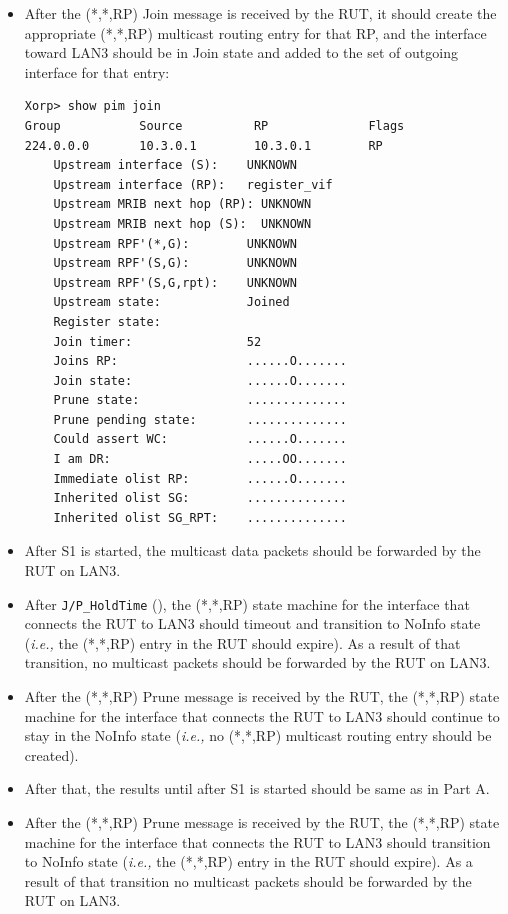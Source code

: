 \documentclass[11pt]{report}
\newcommand{\ie}{\emph{i.e.,}\xspace}
\begin{document}
\begin{itemize}

  \item After the (*,*,RP) Join message is received by the RUT, it
  should create the appropriate (*,*,RP) multicast routing entry for
  that RP, and the interface toward LAN3 should be in Join state and
  added to the set of outgoing interface for that entry:

\begin{verbatim}
Xorp> show pim join 
Group           Source          RP              Flags
224.0.0.0       10.3.0.1        10.3.0.1        RP   
    Upstream interface (S):    UNKNOWN
    Upstream interface (RP):   register_vif
    Upstream MRIB next hop (RP): UNKNOWN
    Upstream MRIB next hop (S):  UNKNOWN
    Upstream RPF'(*,G):        UNKNOWN
    Upstream RPF'(S,G):        UNKNOWN
    Upstream RPF'(S,G,rpt):    UNKNOWN
    Upstream state:            Joined 
    Register state:            
    Join timer:                52
    Joins RP:                  ......O.......
    Join state:                ......O.......
    Prune state:               ..............
    Prune pending state:       ..............
    Could assert WC:           ......O.......
    I am DR:                   .....OO.......
    Immediate olist RP:        ......O.......
    Inherited olist SG:        ..............
    Inherited olist SG_RPT:    ..............
\end{verbatim}

  \item After S1 is started, the multicast data packets should be
  forwarded by the RUT on LAN3.

  \item After \verb=J/P_HoldTime= ({\PimsmJPHoldTime}),
  the (*,*,RP) state machine for the interface that connects the RUT to
  LAN3 should timeout and transition to NoInfo state
  (\ie the (*,*,RP) entry in the RUT should expire).
  As a result of that transition, no multicast packets should be
  forwarded by the RUT on LAN3.

\end{itemize}


\begin{itemize}

  \item After the (*,*,RP) Prune message is received by the RUT,
  the (*,*,RP) state machine for the interface that connects the RUT to
  LAN3 should continue to stay in the NoInfo state (\ie no (*,*,RP) multicast
  routing entry should be created).
  
  \item After that, the results until after S1 is started should be same as in
  Part A.

  \item After the (*,*,RP) Prune message is received by the RUT,
  the (*,*,RP) state machine for the interface that connects the RUT to
  LAN3 should transition to NoInfo state
  (\ie the (*,*,RP) entry in the RUT should expire).
  As a result of that transition no multicast packets should be
  forwarded by the RUT on LAN3.

\end{itemize}
\end{document}
